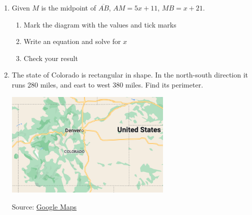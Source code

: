 \begin{enumerate}
\item Given $M$ is the midpoint of $\overline{AB}$, $AM=5x+11$, $MB=x+21$.
  \begin{enumerate}
    \item Mark the diagram with the values and tick marks
    \item Write an equation and solve for $x$
    \item Check your result
  \end{enumerate} \vspace{1cm}
    \begin{flushleft}
    \end{flushleft} \vspace{5cm}

\item The state of Colorado is rectangular in shape. In the north-south direction it runs 280 miles, and east to west 380 miles. Find its perimeter.
  \begin{flushright}
    \includegraphics[width=8cm]{../graphics/Colorado.png} \par
    Source: \href{https://www.google.com/maps/@38,-105,6z/}{Google Maps}
  \end{flushright}



\end{enumerate}
